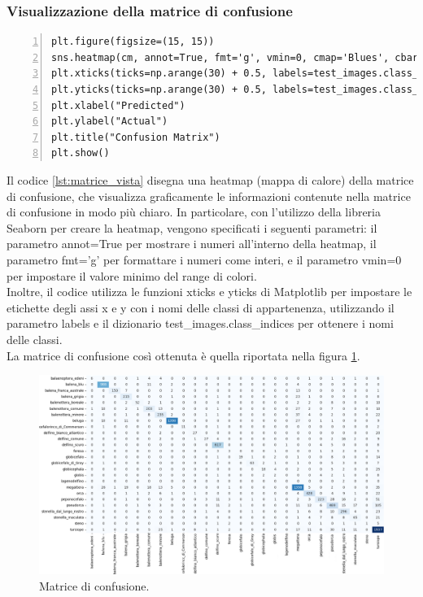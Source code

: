 \documentclass[a4paper,final,12pt]{report}
\begin{document}
\subsubsection{Visualizzazione della matrice di confusione}
\begin{lstlisting}[caption={Codice per la visualizzazione della matrice di confusione.}, label={lst:matrice_vista}, breaklines, escapechar=`\%, frame=lines, basicstyle=\small\ttfamily, keepspaces=true, numbers=left]
plt.figure(figsize=(15, 15))
sns.heatmap(cm, annot=True, fmt='g', vmin=0, cmap='Blues', cbar=False)
plt.xticks(ticks=np.arange(30) + 0.5, labels=test_images.class_indices, rotation=90)
plt.yticks(ticks=np.arange(30) + 0.5, labels=test_images.class_indices, rotation=0)
plt.xlabel("Predicted")
plt.ylabel("Actual")
plt.title("Confusion Matrix")
plt.show()
\end{lstlisting}
Il codice \ref{lst:matrice_vista} disegna una heatmap (mappa di calore) della matrice di confusione, che visualizza graficamente le informazioni contenute nella matrice di confusione in modo più chiaro. In particolare, con l'utilizzo della libreria Seaborn per creare la heatmap, vengono specificati i seguenti parametri: il parametro annot=True per mostrare i numeri all'interno della heatmap, il parametro fmt='g' per formattare i numeri come interi, e il parametro vmin=0 per impostare il valore minimo del range di colori.\\
Inoltre, il codice utilizza le funzioni xticks e yticks di Matplotlib per impostare le etichette degli assi x e y con i nomi delle classi di appartenenza, utilizzando il parametro labels e il dizionario test\_images.class\_indices per ottenere i nomi delle classi.\\
La matrice di confusione così ottenuta è quella riportata nella figura \ref{figura:mapconf}.
\begin{figure}[hbtp]
\centering
\includegraphics[scale=0.42]{img_concettuale/matConf.png}
\caption{Matrice di confusione.}
\label{figura:mapconf}
\end{figure}
\end{document}
